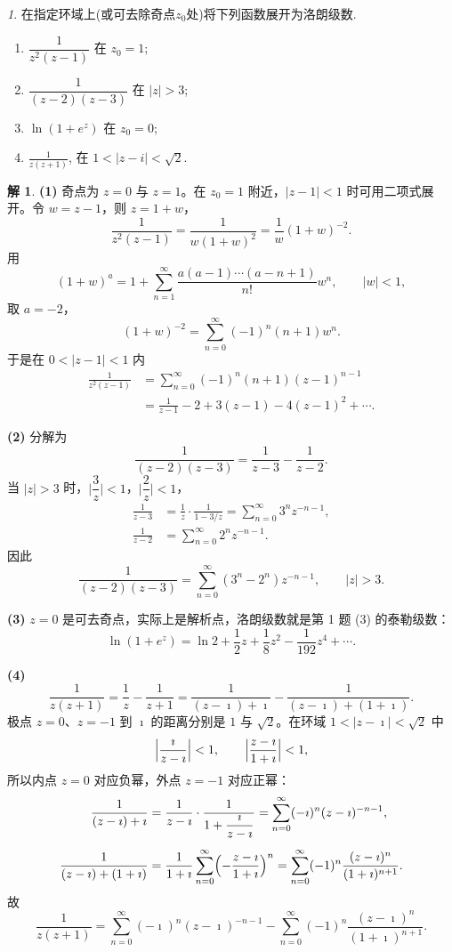 \documentclass[11pt]{article}
\theoremstyle{remark}
\newtheorem{problem}{}
\theoremstyle{definition}
\newtheorem{solution}{解}
\begin{document}
\begin{problem}
  在指定环域上(或可去除奇点$z_0$处)将下列函数展开为洛朗级数.
  \begin{enumerate}
    \item $\dfrac{1}{z^{2}(z-1)}$ 在 $z_0=1$;
    \item $\dfrac{1}{(z-2)(z-3)}$ 在 $|z|>3$;
    \item $\ln \left(1+e^z\right)$ 在 $z_0=0$;
    \item $\frac{1}{z(z+1)}$, 在 $1<|z-i|<\sqrt{2}$.
  \end{enumerate}
\end{problem}

\begin{solution}
\textbf{(1)}
奇点为 $z=0$ 与 $z=1$。在 $z_{0}=1$ 附近，$|z-1|<1$ 时可用二项式展开。令 $w=z-1$，则 $z=1+w$，
\[
\frac{1}{z^{2}(z-1)}
=\frac{1}{w(1+w)^{2}}
=\frac{1}{w}(1+w)^{-2}.
\]
用
\[
(1+w)^{a}
=1+\sum_{n=1}^{\infty}\frac{a(a-1)\cdots(a-n+1)}{n!}w^{n},
\qquad |w|<1,
\]
取 $a=-2$，
\[
(1+w)^{-2}
=\sum_{n=0}^{\infty}(-1)^{n}(n+1)w^{n}.
\]
于是在 $0<|z-1|<1$ 内
\begin{align*}
\frac{1}{z^{2}(z-1)}
&=\sum_{n=0}^{\infty}(-1)^{n}(n+1)(z-1)^{n-1}\\
&=\frac{1}{z-1}-2+3(z-1)-4(z-1)^{2}+\cdots.
\end{align*}

\textbf{(2)}
分解为
\[
\frac{1}{(z-2)(z-3)}=\frac{1}{z-3}-\frac{1}{z-2}.
\]
当 $|z|>3$ 时，$\bigl|\dfrac{3}{z}\bigr|<1$，$\bigl|\dfrac{2}{z}\bigr|<1$，
\begin{align*}
\frac{1}{z-3}
&=\frac{1}{z}\cdot\frac{1}{1-3/z}
=\sum_{n=0}^{\infty}3^{n}z^{-n-1},\\
\frac{1}{z-2}
&=\sum_{n=0}^{\infty}2^{n}z^{-n-1}.
\end{align*}
因此
\[
\frac{1}{(z-2)(z-3)}
=\sum_{n=0}^{\infty}(3^{n}-2^{n})z^{-n-1},\qquad |z|>3.
\]

\textbf{(3)}
$z=0$ 是可去奇点，实际上是解析点，洛朗级数就是第 1 题 (3) 的泰勒级数：
\[
\ln(1+e^{z})
=\ln 2+\frac12 z+\frac18 z^{2}-\frac{1}{192}z^{4}+\cdots.
\]

\textbf{(4)}
\[
\frac{1}{z(z+1)}=\frac{1}{z}-\frac{1}{z+1}
=\frac{1}{(z-\imath)+\imath}-\frac{1}{(z-\imath)+(1+\imath)}.
\]
极点 $z=0$、$z=-1$ 到 $\imath$ 的距离分别是 $1$ 与 $\sqrt{2}$。在环域 $1<|z-\imath|<\sqrt{2}$ 中
\[
\Bigl|\frac{\imath}{z-\imath}\Bigr|<1,
\qquad
\Bigl|\frac{z-\imath}{1+\imath}\Bigr|<1,
\]
所以内点 $z=0$ 对应负幂，外点 $z=-1$ 对应正幂：
\begin{align*}
\frac{1}{(z-\imath)+\imath}
&=\frac{1}{z-\imath}\cdot\frac{1}{1+\dfrac{\imath}{z-\imath}}
=\sum_{n=0}^{\infty}(-\imath)^{n}(z-\imath)^{-n-1},\\[4pt]
\frac{1}{(z-\imath)+(1+\imath)}
&=\frac{1}{1+\imath}\sum_{n=0}^{\infty}\Bigl(-\frac{z-\imath}{1+\imath}\Bigr)^{n}
=\sum_{n=0}^{\infty}(-1)^{n}\frac{(z-\imath)^{n}}{(1+\imath)^{n+1}}.
\end{align*}
故
\[
\frac{1}{z(z+1)}
=\sum_{n=0}^{\infty}(-\imath)^{n}(z-\imath)^{-n-1}
-\sum_{n=0}^{\infty}(-1)^{n}\frac{(z-\imath)^{n}}{(1+\imath)^{n+1}}.
\]
\end{solution}
\end{document}
